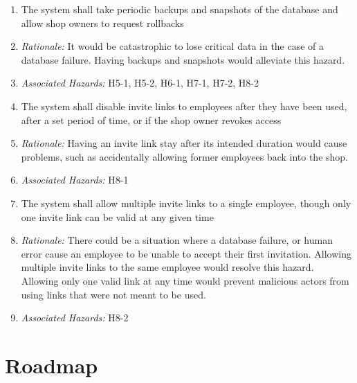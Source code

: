 \documentclass{article}
\begin{document}
\begin{enumerate}[label=SR\arabic*.]
	\item The system shall take periodic backups and snapshots of the database and allow shop owners to
	      request rollbacks
	\item[] \emph{Rationale:} It would be catastrophic to lose critical data in the case of a database failure.
		Having backups and snapshots would alleviate this hazard.
	\item[] \emph{Associated Hazards:} H5-1, H5-2, H6-1, H7-1, H7-2, H8-2 \\
	\item The system shall disable invite links to employees after they have been used, after a set period of
	      time, or if the shop owner revokes access
	\item[] \emph{Rationale:} Having an invite link stay after its intended duration would cause problems, such
		as accidentally allowing former employees back into the shop.
	\item[] \emph{Associated Hazards:} H8-1 \\
	\item The system shall allow multiple invite links to a single employee, though only one invite link can
	      be valid at any given time
	\item[] \emph{Rationale:} There could be a situation where a database failure, or human error cause an
		employee to be unable to accept their first invitation. Allowing multiple invite links to the same
		employee would resolve this hazard. Allowing only one valid link at any time would prevent malicious
		actors from using links that were not meant to be used.
	\item[] \emph{Associated Hazards:} H8-2 \\
\end{enumerate}


\section{Roadmap}


\end{document}
